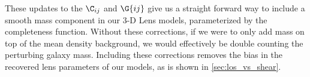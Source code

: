 These updates to the $\C_{i j}$ and $\G{i j}$ give us a straight forward way to include a smooth mass component in our 3-D Lens models, parameterized by the completeness function. Without these corrections, if we were to only add mass on top of the mean density background, we would effectively be double counting the perturbing galaxy mass. Including these corrections removes the bias in the recovered lens parameters of our models, as is shown in \ref{sec:los_vs_shear}.
